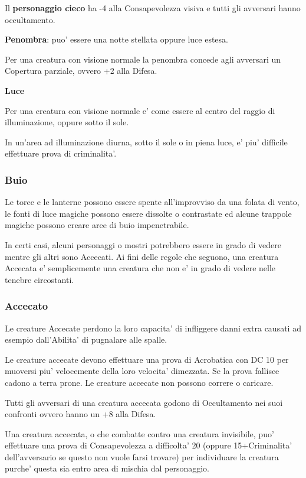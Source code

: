 \documentclass[a4paper,11pt,twoside,openany]{dndbook}
\begin{document}
{Il \textbf{personaggio cieco} ha -4 alla Consapevolezza visiva e tutti gli avversari hanno occultamento.

\textbf{Penombra}: puo' essere una notte stellata oppure luce estesa.

Per una creatura con visione normale la penombra concede agli avversari
un Copertura parziale, ovvero +2 alla Difesa.

\textbf{Luce}

Per una creatura con visione normale e' come essere al centro del raggio di illuminazione, oppure sotto il sole.

In un'area ad illuminazione diurna, sotto il sole o in piena luce, e' piu' difficile effettuare prova di criminalita'.

\subsubsection{Buio}

\label{buio}

Le torce e le lanterne possono essere spente all'improvviso da una folata di vento, le fonti di luce magiche possono essere dissolte o contrastate ed alcune trappole magiche possono creare aree di buio impenetrabile.

In certi casi, alcuni personaggi o mostri potrebbero essere in grado di vedere mentre gli altri sono Accecati. Ai fini delle regole che seguono, una creatura Accecata e' semplicemente una creatura che non e' in grado di vedere nelle tenebre circostanti.

\subsubsection{Accecato}

\label{accecato}

Le creature Accecate perdono la loro capacita' di infliggere danni extra causati ad esempio dall'Abilita' di pugnalare alle spalle.

Le creature accecate devono effettuare una prova di Acrobatica con DC 10 per muoversi piu' velocemente della loro velocita' dimezzata. Se la prova fallisce cadono a terra prone. Le creature accecate non possono correre o caricare.

Tutti gli avversari di una creatura accecata godono di Occultamento nei suoi confronti ovvero hanno un +8 alla Difesa.

Una creatura accecata, o che combatte contro una creatura invisibile, puo' effettuare una prova di Consapevolezza a difficolta' 20 (oppure 15+Criminalita' dell'avversario se questo non vuole farsi trovare) per individuare la creatura purche' questa sia entro area di mischia dal personaggio.

}
\end{document}
